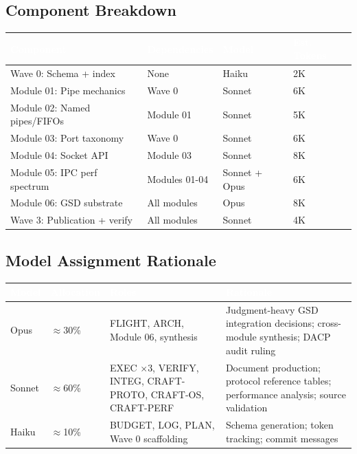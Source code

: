 \documentclass[11pt,letterpaper]{article}
\newcommand{\tableheader}[1]{\textbf{\sffamily\textcolor{white}{#1}}}
\begin{document}
\subsection{Component Breakdown}

\begin{center}
\begin{tabularx}{\textwidth}{L{3.5cm}L{2.5cm}C{1.5cm}C{2cm}}
\toprule
{}
\tableheader{Component} & \tableheader{Dependencies} & \tableheader{Model} & \tableheader{Est. Tokens} \\
\midrule
Wave 0: Schema + index & None & Haiku & 2K \\
Module 01: Pipe mechanics & Wave 0 & Sonnet & 6K \\
Module 02: Named pipes/FIFOs & Module 01 & Sonnet & 5K \\
Module 03: Port taxonomy & Wave 0 & Sonnet & 6K \\
Module 04: Socket API & Module 03 & Sonnet & 8K \\
Module 05: IPC perf spectrum & Modules 01-04 & Sonnet + Opus & 6K \\
Module 06: GSD substrate & All modules & Opus & 8K \\
Wave 3: Publication + verify & All modules & Sonnet & 4K \\
\bottomrule
\end{tabularx}
\end{center}

\subsection{Model Assignment Rationale}

\begin{center}
\begin{tabularx}{\textwidth}{L{2cm}C{2cm}L{2cm}X}
\toprule
{}
\tableheader{Model} & \tableheader{Allocation} & \tableheader{Roles} & \tableheader{Rationale} \\
\midrule
Opus & $\approx$30\% & FLIGHT, ARCH, Module 06, synthesis & Judgment-heavy GSD integration decisions; cross-module synthesis; DACP audit ruling \\
Sonnet & $\approx$60\% & EXEC $\times$3, VERIFY, INTEG, CRAFT-PROTO, CRAFT-OS, CRAFT-PERF & Document production; protocol reference tables; performance analysis; source validation \\
Haiku & $\approx$10\% & BUDGET, LOG, PLAN, Wave 0 scaffolding & Schema generation; token tracking; commit messages \\
\bottomrule
\end{tabularx}
\end{center}
\end{document}
